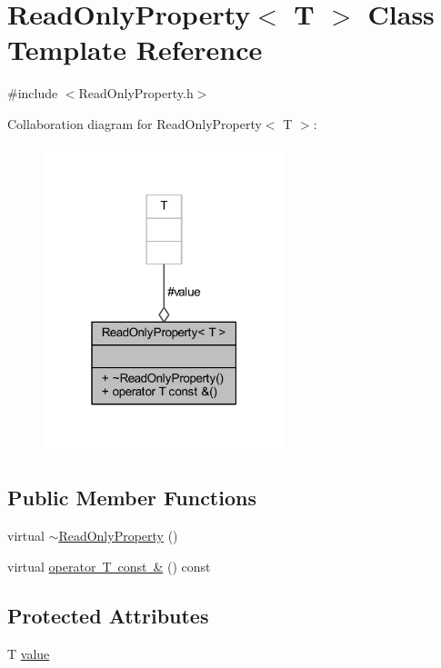 \hypertarget{classReadOnlyProperty}{}\section{Read\+Only\+Property$<$ T $>$ Class Template Reference}
\label{classReadOnlyProperty}


{\ttfamily \#include $<$Read\+Only\+Property.\+h$>$}



Collaboration diagram for Read\+Only\+Property$<$ T $>$\+:
\nopagebreak
\begin{figure}[H]
\begin{center}
\leavevmode
\includegraphics[width=199pt]{classReadOnlyProperty__coll__graph}
\end{center}
\end{figure}
\subsection*{Public Member Functions}
\begin{DoxyCompactItemize}
\item 
virtual \mbox{\hyperlink{classReadOnlyProperty_aa34b40fc62c654174c672fabf07ddf10}{$\sim$\+Read\+Only\+Property}} ()
\item 
virtual \mbox{\hyperlink{classReadOnlyProperty_a9e46deac4a2cea32d6914ff518fe0fed}{operator T const \&}} () const
\end{DoxyCompactItemize}
\subsection*{Protected Attributes}
\begin{DoxyCompactItemize}
\item 
T \mbox{\hyperlink{classReadOnlyProperty_a2c873d913c72f4a024499e0ff68bb527}{value}}
\end{DoxyCompactItemize}


